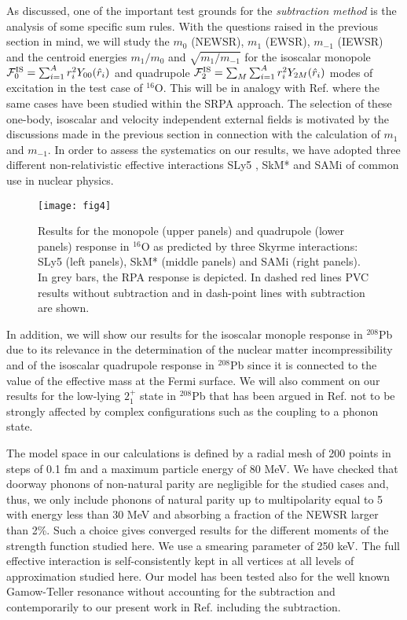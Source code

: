 \documentclass[12pt,a4paper,final]{iopart}
\begin{document}
As discussed, one of the important test grounds for the {\it subtraction method} is the analysis of some specific sum rules. With the questions raised in the previous section in mind, we will study the $m_0$ (NEWSR), $m_1$ (EWSR), $m_{-1}$ (IEWSR) and the centroid energies $m_1/m_0$ and $\sqrt{m_1 / m_{-1}}$ for the isoscalar monopole $\mathcal{F}_{0}^{\rm IS}=\sum_{i=1}^{A}r_i^2Y_{00}(\hat{r}_i)$ and quadrupole $\mathcal{F}_{2}^{\rm IS}=\sum_M\sum_{i=1}^{A}r_i^2Y_{2M}(\hat{r}_i)$ modes of excitation in the test case of ${}^{16}$O. This will be in analogy with Ref.\cite{gambacurta2015} where the same cases have been studied within the SRPA approach. The selection of these one-body, isoscalar and velocity independent external fields is motivated by the discussions made in the previous section in connection with the calculation of $m_1$ and $m_{-1}$. In order to assess the systematics on our results, we have adopted three different non-relativistic effective interactions SLy5 \cite{sly5}, SkM* \cite{skm} and SAMi \cite{sami} of common use in nuclear physics.

\begin{figure}[t!]                    
\texttt{[image: fig4]}
\caption{Results for the monopole (upper panels) and quadrupole (lower panels) response in ${}^{16}$O as predicted by three Skyrme interactions: SLy5 \cite{sly5} (left panels), SkM* \cite{skm} (middle panels) and SAMi \cite{sami} (right panels). In grey bars, the RPA response is depicted. In dashed red lines PVC results without subtraction and in dash-point lines with subtraction are shown.} 
\label{fig4} 
\end{figure}

In addition, we will show our results for the isoscalar monople response in ${}^{208}$Pb due to its relevance in the determination of the nuclear matter incompressibility and of the isoscalar quadrupole response in ${}^{208}$Pb since it is connected to the value of the effective mass at the Fermi surface. We will also comment on our results for the low-lying $2_1^+$ state in ${}^{208}$Pb that has been argued in Ref.\cite{lyutorovich2016} not to be strongly affected by complex configurations such as the coupling to a phonon state.

The model space in our calculations is defined by a radial mesh of 200 points in steps of 0.1 fm and a maximum particle energy of 80 MeV. We have checked that doorway phonons of non-natural parity are negligible for the studied cases and, thus, we only include phonons of natural parity up to multipolarity equal to 5 with energy less than 30 MeV and absorbing a fraction of the NEWSR larger than 2\%. Such a choice gives converged results for the different moments of the strength function studied here. We use a smearing parameter of 250 keV. The full effective interaction is self-consistently kept in all vertices at all levels of approximation studied here. Our model has been tested also for the well known Gamow-Teller resonance \cite{niu2014,yifei2015} without accounting for the subtraction and contemporarily to our present work in Ref.\cite{niu2016} including the subtraction.
\end{document}
